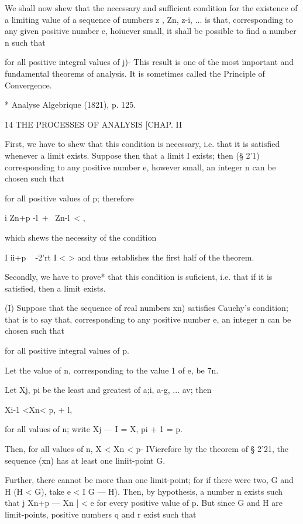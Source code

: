 We shall now shew that the necessary and sufficient condition for the
existence of a limiting value of a sequence of numbers z , Zn, z-i,
... is that, corresponding to any given positive number e, hoiuever
small, it shall be possible to find a number n such that

for all positive integral values of j)- This result is one of the most
important and fundamental theorems of analysis. It is sometimes called
the Principle of Convergence.

* Analyse Algebrique (1821), p. 125.



14 THE PROCESSES OF ANALYSIS [CHAP. II

First, we have to shew that this condition is necessary, i.e. that it
is satisfied whenever a limit exists. Suppose then that a limit I
exists; then (§ 2'1) corresponding to any positive number e, however
small, an integer n can be chosen such that

for all positive values of p; therefore

  i Zn+p -l\ + \ Zn-l\ < ,

which shews the necessity of the condition

I ii+p ~ -2'rt I < > and thus establishes the first half of the
theorem.

Secondly, we have to prove* that this condition is suficient, i.e.
that if it is satisfied, then a limit exists.

(I) Suppose that the sequence of real numbers xn) satisfies Cauchy's
condition; that is to say that, corresponding to any positive number
e, an integer n can be chosen such that

for all positive integral values of p.

Let the value of n, corresponding to the value 1 of e, be 7n.

Let Xj, pi be the least and greatest of a;i, a-g, ... av; then

Xi-1 <Xn< p, + l,

for all values of n; write Xj — I = X, pi + 1 = p.

Then, for all values of n, X < Xn < p- IVierefore by the theorem of §
2'21, the sequence (xn) has at least one liniit-point G.

Further, there cannot be more than one limit-point; for if there were
two, G and H (H < G), take e < I G — H). Then, by hypothesis, a number
n exists such that j Xn+p — Xn | < e for every positive value of p.
But since G and H are limit-points, positive numbers q and r exist
such that

